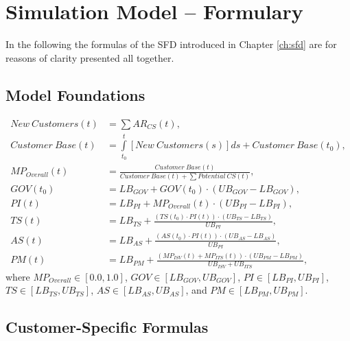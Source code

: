 \chapter{Simulation Model -- Formulary}\label{ch:app04}

In the following the formulas of the \ac{SFD} introduced in Chapter \ref{ch:sfd} are for reasons of clarity presented all together.

\section{Model Foundations}\label{ch:app04:mf}
\begin{align}
	\mathit{New~Customers(t)} &= \sum AR_{CS}(t),\\
	\mathit{Customer~Base(t)} &= \int\limits_{t_0}^t \mathit{[New~Customers(s)]ds} + \mathit{Customer~Base(t_0)},\\
	MP_{Overall}(t) &= \frac{\mathit{Customer~Base(t)}}{\mathit{Customer~Base(t)} + \sum \mathit{Potential~CS(t)}},\\
	GOV(t_0) &= LB_{GOV} + GOV(t_0) \cdot (UB_{GOV} - LB_{GOV}),\\
	PI(t) &= LB_{PI} + MP_{Overall}(t) \cdot (UB_{PI} - LB_{PI}),\\
	TS(t) &= LB_{TS} +  \frac{(TS(t_0) \cdot PI(t)) \cdot (UB_{TS} - LB_{TS})}{UB_{PI}},\\
	AS(t) &= LB_{AS} +  \frac{(AS(t_0)  \cdot PI(t)) \cdot (UB_{AS} - LB_{AS})}{UB_{PI}},\\
	PM(t) &= LB_{PM} + \frac{(MP_{ISV}(t) + MP_{ITS}(t)) \cdot (UB_{PM} - LB_{PM})}{UB_{ISV} + UB_{ITS}},
\end{align}
where $MP_{Overall} \in [0.0,1.0]$, $GOV \in [LB_{GOV},UB_{GOV}]$, $PI \in [LB_{PI},UB_{PI}]$, $TS \in [LB_{TS},UB_{TS}]$, $AS \in [LB_{AS},UB_{AS}]$, and $PM \in [LB_{PM},UB_{PM}]$.
	
\newpage

\section{Customer-Specific Formulas}\label{ch:app04:csf}


